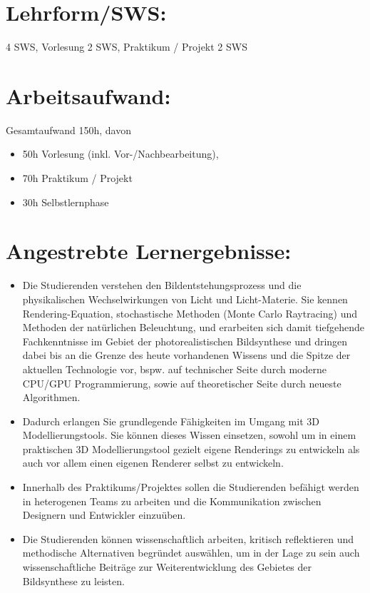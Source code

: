 \section*{Lehrform/SWS:}\label{lehrformsws-16}

4 SWS, Vorlesung 2 SWS, Praktikum / Projekt 2 SWS

\section*{Arbeitsaufwand:}\label{arbeitsaufwand-22}

Gesamtaufwand 150h, davon

\begin{itemize}
\item
  50h Vorlesung (inkl. Vor-/Nachbearbeitung),
\item
  70h Praktikum / Projekt
\item
  30h Selbstlernphase
\end{itemize}

\section*{Angestrebte
Lernergebnisse:}\label{angestrebte-lernergebnisse-16}

\begin{itemize}
\item
  Die Studierenden verstehen den Bildentstehungsprozess und die
  physikalischen Wechselwirkungen von Licht und Licht-Materie. Sie
  kennen Rendering-Equation, stochastische Methoden (Monte Carlo
  Raytracing) und Methoden der natürlichen Beleuchtung, und erarbeiten
  sich damit tiefgehende Fachkenntnisse im Gebiet der photorealistischen
  Bildsynthese und dringen dabei bis an die Grenze des heute vorhandenen
  Wissens und die Spitze der aktuellen Technologie vor, bspw. auf
  technischer Seite durch moderne CPU/GPU Programmierung, sowie auf
  theoretischer Seite durch neueste Algorithmen.
\item
  Dadurch erlangen Sie grundlegende Fähigkeiten im Umgang mit 3D
  Modellierungstools. Sie können dieses Wissen einsetzen, sowohl um in
  einem praktischen 3D Modellierungstool gezielt eigene Renderings zu
  entwickeln als auch vor allem einen eigenen Renderer selbst zu
  entwickeln.
\item
  Innerhalb des Praktikums/Projektes sollen die Studierenden befähigt
  werden in heterogenen Teams zu arbeiten und die Kommunikation zwischen
  Designern und Entwickler einzuüben.
\item
  Die Studierenden können wissenschaftlich arbeiten, kritisch
  reflektieren und methodische Alternativen begründet auswählen, um in
  der Lage zu sein auch wissenschaftliche Beiträge zur Weiterentwicklung
  des Gebietes der Bildsynthese zu leisten.
\end{itemize}

